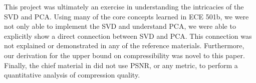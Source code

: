 \documentclass[conference]{IEEEtran}
\begin{document}
    This project was ultimately an exercise in understanding the intricacies of the SVD and PCA. Using many of the core concepts learned in ECE 501b, we were not only able to implement the SVD and understand PCA, we were able to explicitly show a direct connection between SVD and PCA. This connection was not explained or demonstrated in any of the reference materials. Furthermore, our derivation for the upper bound on compressibility was novel to this paper. Finally, the chief material in \cite{jaradet_svd_image_compression} did not use PSNR, or any metric, to perform a quantitative analysis of compression quality.

    {}
    
\end{document}
